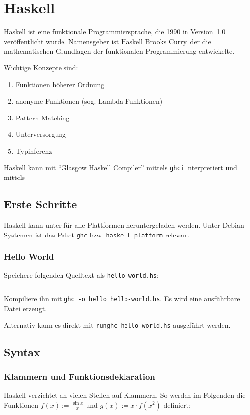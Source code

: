 \chapter{Haskell}
Haskell ist eine funktionale Programmiersprache, die 1990 in Version~1.0 veröffentlicht 
wurde. Namensgeber ist Haskell Brooks Curry, der die mathematischen Grundlagen der funktionalen Programmierung entwickelte.

Wichtige Konzepte sind:
\begin{enumerate}
    \item Funktionen höherer Ordnung
    \item anonyme Funktionen (sog. Lambda-Funktionen)
    \item Pattern Matching
    \item Unterversorgung
    \item Typinferenz
\end{enumerate}

Haskell kann mit \enquote{Glasgow Haskell Compiler} mittels 
\texttt{ghci} interpretiert und mittels 

\section{Erste Schritte}
Haskell kann unter \href{http://www.haskell.org/platform/}{}
für alle Plattformen heruntergeladen werden. Unter Debian-Systemen
ist das Paket \texttt{ghc} bzw. \texttt{haskell-platform} relevant.

\subsection{Hello World}
Speichere folgenden Quelltext als \texttt{hello-world.hs}:
\inputminted[linenos, numbersep=5pt, tabsize=4, frame=lines, label=hello-world.hs]{haskell}{scripts/haskell/hello-world.hs}

Kompiliere ihn mit \texttt{ghc -o hello hello-world.hs}. Es wird eine
ausführbare Datei erzeugt.

Alternativ kann es direkt mit \texttt{runghc hello-world.hs} ausgeführt werden.

\section{Syntax}
\subsection{Klammern und Funktionsdeklaration}
Haskell verzichtet an vielen Stellen auf Klammern. So werden im
Folgenden die Funktionen $f(x) := \frac{\sin x}{x}$ und $g(x) := x \cdot f(x^2)$
definiert:

